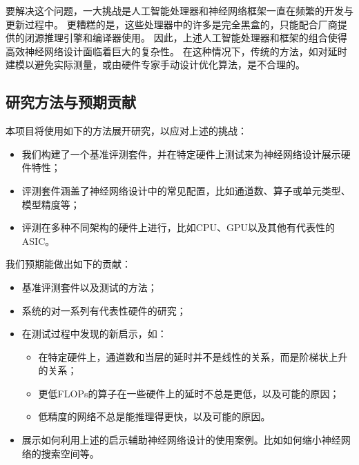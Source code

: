 要解决这个问题，一大挑战是人工智能处理器和神经网络框架一直在频繁的开发与更新过程中。
更糟糕的是，这些处理器中的许多是完全黑盒的，只能配合厂商提供的闭源推理引擎和编译器使用。
因此，上述人工智能处理器和框架的组合使得高效神经网络设计面临着巨大的复杂性。
在这种情况下，传统的方法，如对延时建模以避免实际测量，或由硬件专家手动设计优化算法，是不合理的。

\subsection{研究方法与预期贡献}
本项目将使用如下的方法展开研究，以应对上述的挑战：
\begin{itemize}
    \item 我们构建了一个基准评测套件，并在特定硬件上测试来为神经网络设计展示硬件特性；
    \item 评测套件涵盖了神经网络设计中的常见配置，比如通道数、算子或单元类型、模型精度等；
    \item 评测在多种不同架构的硬件上进行，比如CPU、GPU以及其他有代表性的ASIC。
\end{itemize}

我们预期能做出如下的贡献：
\begin{itemize}
    \item 基准评测套件以及测试的方法；
    \item 系统的对一系列有代表性硬件的研究；
    \item 在测试过程中发现的新启示，如：
    \begin{itemize}
        \item 在特定硬件上，通道数和当层的延时并不是线性的关系，而是阶梯状上升的关系；
        \item 更低FLOPs的算子在一些硬件上的延时不总是更低，以及可能的原因；
        \item 低精度的网络不总是能推理得更快，以及可能的原因。
    \end{itemize}
    \item 展示如何利用上述的启示辅助神经网络设计的使用案例。比如如何缩小神经网络的搜索空间等。
\end{itemize}